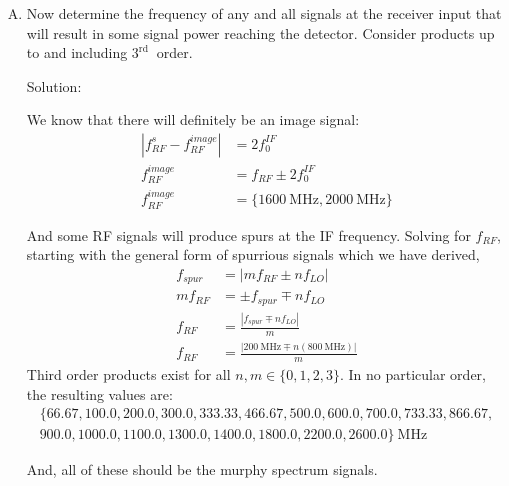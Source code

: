 \begin{homeworkProblem}
\begin{enumerate}[A.]
\begin{callout}{Solution:}
                The filter kills off any signal not at 200 MHz, so we just get the spur through it. Everything else appears just before the filter.

            \end{callout}
            \newpage
        \item Now determine the frequency of any and all signals at the receiver input that will result in some signal power reaching the detector. Consider products up to and including $3^{\text {rd }}$ order.
            \begin{callout}{Solution:}

                We know that there will definitely be an image signal:
                \begin{align*}
                    |f_{RF}^{s}-f_{RF}^{image}|&=2f_{0}^{IF} \\ 
                    f_{RF}^{image}&= f_{RF} \pm 2f_{0}^{IF} \\ 
                    f_{RF}^{image}&= \{ \mathrm{1600~MHz, 2000~MHz} \} 
                \end{align*}

                And some RF signals will produce spurs at the IF frequency. Solving for $f_{RF}$, starting with the general form of spurrious signals which we have derived,
                \begin{align*}
                    f_{spur} &= | mf_{RF} \pm nf_{LO} | \\
                    mf_{RF} &=  \pm f_{spur} \mp nf_{LO} \\
                    f_{RF} &=  \frac{|f_{spur} \mp nf_{LO}|}{m} \\
                    f_{RF} &=  \frac{|\mathrm{200~MHz} \mp n\mathrm{(800~MHz)}|}{m}
                \end{align*}
                Third order products exist for all $n,m \in \{ 0,1,2,3 \}$. In no particular order, the resulting values are: 
                \begin{gather*}
                    \{ 66.67, 100.0, 200.0, 300.0, 333.33, 466.67, 500.0, 600.0, 700.0, 733.33, 866.67,\\ 900.0, 1000.0, 1100.0, 1300.0, 1400.0, 1800.0, 2200.0, 2600.0 \}~\mathrm{MHz}
                \end{gather*}

                And, all of these should be the murphy spectrum signals.
            \end{callout}
    \end{enumerate}
\end{homeworkProblem}

